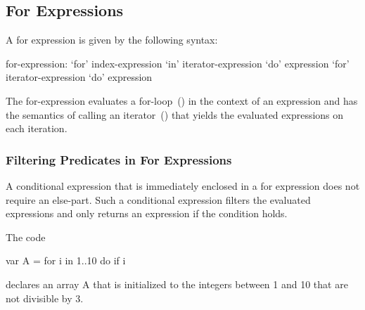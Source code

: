 \subsection{For Expressions}
\label{For_Expressions}

A for expression is given by the following syntax:
\begin{syntax}
for-expression:
  `for' index-expression `in' iterator-expression `do' expression
  `for' iterator-expression `do' expression
\end{syntax}
The for-expression evaluates a for-loop~() in the
context of an expression and has the semantics of calling an
iterator~() that yields the evaluated expressions on
each iteration.

\subsubsection{Filtering Predicates in For Expressions}
\label{Filtering_Predicates_For}

A conditional expression that is immediately enclosed in a for
expression does not require an else-part.  Such a conditional
expression filters the evaluated expressions and only returns an
expression if the condition holds.

\begin{example}
The code
\begin{chapel}
var A = for i in 1..10 do if i %
\end{chapel}
declares an array A that is initialized to the integers between
1 and 10 that are not divisible by 3.
\end{example}
